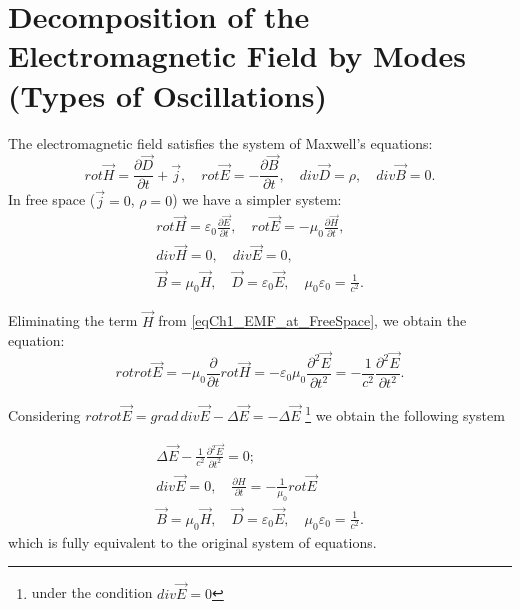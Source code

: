 \section{Decomposition of the Electromagnetic Field by Modes (Types of Oscillations)}
The electromagnetic field satisfies the system of Maxwell's equations:
\begin{equation}
rot \vec{H} = \frac{\partial \vec{D}}{\partial t} + \vec{j}, 
\quad
rot \vec{E} = - \frac{\partial \vec{B}}{\partial t}, 
\quad
div \vec{D} = \rho, \quad
div \vec{B} = 0.
\end{equation}
In free space ($\vec{j} = 0$, $\rho = 0$) we have a simpler system:
\begin{eqnarray}
rot \vec{H} = \varepsilon_0 \frac{\partial \vec{E}}{\partial t}, 
\quad
rot \vec{E} = - \mu_0 \frac{\partial \vec{H}}{\partial t}, 
\nonumber \\
div \vec{H} = 0,
\quad
div \vec{E} = 0, 
\nonumber \\
\vec{B} = \mu_0 \vec{H}, 
\quad 
\vec{D} = \varepsilon_0 \vec{E}, 
\quad
\mu_0 \varepsilon_0 = \frac{1}{c^2}.
\label{eqCh1_EMF_at_FreeSpace}
\end{eqnarray}

Eliminating the term $\vec{H}$ from \eqref{eqCh1_EMF_at_FreeSpace}, we obtain the equation:
\begin{equation}
rot rot \vec{E} = - \mu_0 \frac{\partial}{\partial t} rot \vec{H} = -
\varepsilon_0 \mu_0 \frac{\partial^2 \vec{E}}{\partial t^2} = 
- \frac{1}{c^2} \frac{\partial^2 \vec{E}}{\partial t^2}.
\nonumber
\end{equation}

Considering $rot rot \vec{E} = grad \, div \vec{E} - \Delta \vec{E} = - \Delta
\vec{E}$ \footnote{under the condition $div \vec E = 0$} we obtain the following system

\begin{eqnarray}
\Delta \vec{E} - \frac{1}{c^2} \frac{\partial^2 \vec{E}}{\partial t^2}
= 0;
\nonumber \\
div \vec{E} = 0, 
\quad
\frac{\partial H}{\partial t} = - \frac{1}{\mu_0} rot \vec{E}
\nonumber \\
\vec{B} = \mu_0 \vec{H}, \quad \vec{D} = \varepsilon_0 \vec{E}, \quad \mu_0
\varepsilon_0 = \frac{1}{c^2}.
\label{eqCh1_EMF_at_FreeSpace2}
\end{eqnarray}
which is fully equivalent to the original system of equations.

